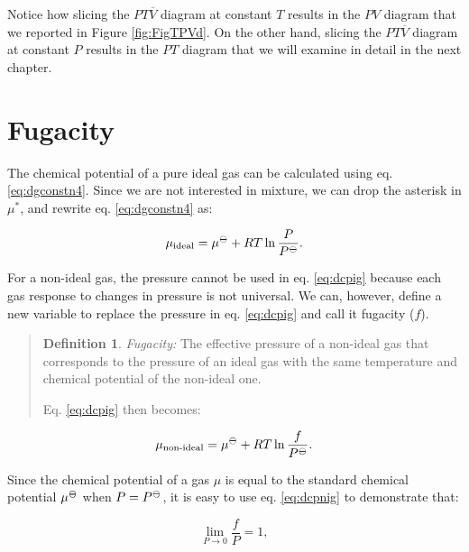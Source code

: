 \documentclass[
  9pt,
]{extbook}
\theoremstyle{definition}
\newtheorem{definition}{Definition}[chapter]
\theoremstyle{definition}
\theoremstyle{definition}
\theoremstyle{remark}
\begin{document}
Notice how slicing the \(PT\overline{V}\) diagram at constant \(T\) results in the \(PV\) diagram that we reported in Figure \ref{fig:FigTPVd}. On the other hand, slicing the \(PT\overline{V}\) diagram at constant \(P\) results in the \(PT\) diagram that we will examine in detail in the next chapter.

\hypertarget{fugacity}{%
\section{Fugacity}\label{fugacity}}

The chemical potential of a pure ideal gas can be calculated using eq. \eqref{eq:dgconstn4}. Since we are not interested in mixture, we can drop the asterisk in \(\mu^*\), and rewrite eq. \eqref{eq:dgconstn4} as:

\begin{equation}
\mu_{\text{ideal}} = \mu^{-\kern-6pt{\ominus}\kern-6pt-}+ RT \ln \frac{P}{P^{-\kern-6pt{\ominus}\kern-6pt-}}.
\label{eq:dcpig}
\end{equation}

For a non-ideal gas, the pressure cannot be used in eq. \eqref{eq:dcpig} because each gas response to changes in pressure is not universal. We can, however, define a new variable to replace the pressure in eq. \eqref{eq:dcpig} and call it fugacity (\(f\)).

\begin{quote}
\begin{definition}
\protect\hypertarget{def:fugacitydef}{}{\label{def:fugacitydef} }\emph{Fugacity:} The effective pressure of a non-ideal gas that corresponds to the pressure of an ideal gas with the same temperature and chemical potential of the non-ideal one.
\end{definition}

Eq. \eqref{eq:dcpig} then becomes:
\end{quote}

\begin{equation}
\mu_{\text{non-ideal}} = \mu^{-\kern-6pt{\ominus}\kern-6pt-}+ RT \ln \frac{f}{P^{-\kern-6pt{\ominus}\kern-6pt-}}.
\label{eq:dcpnig}
\end{equation}

Since the chemical potential of a gas \(\mu\) is equal to the standard chemical potential \(\mu^{-\kern-6pt{\ominus}\kern-6pt-}\) when \(P=P^{-\kern-6pt{\ominus}\kern-6pt-}\), it is easy to use eq. \eqref{eq:dcpnig} to demonstrate that:

\begin{equation}
\lim_{P\rightarrow 0} \frac{f}{P} = 1,
\label{eq:dcpnigL}
\end{equation}
\end{document}
